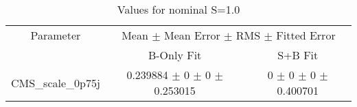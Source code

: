 \begin{table}
\centering
\caption{Values for nominal S=1.0}
\begin{tabular}{ccc}
\toprule
Parameter & \multicolumn{2}{c}{Mean $\pm$ Mean Error $\pm$ RMS $\pm$ Fitted Error}\\
 & B-Only Fit & S+B Fit\\
\midrule
CMS\_scale\_0p75j & \num{0.239884} $\pm$ \num{0} $\pm$ \num{0} $\pm$ \num{0.253015} & \num{0} $\pm$ \num{0} $\pm$ \num{0} $\pm$ \num{0.400701}\\
\bottomrule
\end{tabular}
\end{table}